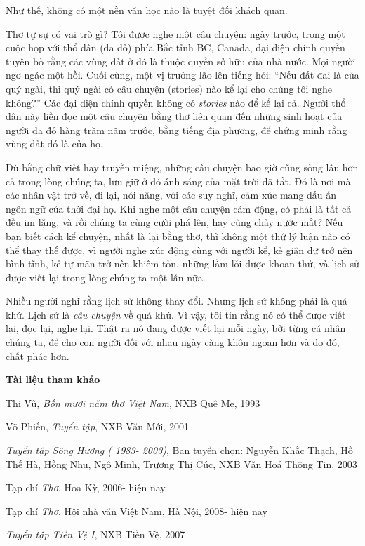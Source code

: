 \documentclass[../main.tex]{subfiles}
\begin{document}
\begin{multicols}{2}
Như thế, không có một nền văn học nào là tuyệt đối khách quan. 
 
Thơ tự sự có vai trò gì? Tôi được nghe một câu chuyện: ngày trước, trong một cuộc họp với thổ dân (da đỏ) phía Bắc tỉnh BC, Canada, đại diện chính quyền tuyên bố rằng các vùng đất ở đó là thuộc quyền sở hữu của nhà nước. Mọi người ngơ ngác một hồi. Cuối cùng, một vị trưởng lão lên tiếng hỏi: “Nếu đất đai là của quý ngài, thì quý ngài có câu chuyện (stories) nào kể lại cho chúng tôi nghe không?” Các đại diện chính quyền không có \textit{stories} nào để kể lại cả. Người thổ dân này liền đọc một câu chuyện bằng thơ liên quan đến những sinh hoạt của người da đỏ hàng trăm năm trước, bằng tiếng địa phương, để chứng minh rằng vùng đất đó là của họ.  
 
Dù bằng chữ viết hay truyền miệng, những câu chuyện bao giờ cũng sống lâu hơn cả trong lòng chúng ta, lưu giữ ở đó ánh sáng của mặt trời đã tắt. Đó là nơi mà các nhân vật trở về, đi lại, nói năng, với các suy nghĩ, cảm xúc mang dấu ấn ngôn ngữ của thời đại họ. Khi nghe một câu chuyện cảm động, có phải là tất cả đều im lặng, và rồi chúng ta cùng cười phá lên, hay cùng chảy nước mắt? Nếu bạn biết cách kể chuyện, nhất là lại bằng thơ, thì không một thứ lý luận nào có thể thay thế được, vì người nghe xúc động cùng với người kể, kẻ giận dữ trở nên bình tĩnh, kẻ tự mãn trở nên khiêm tốn, những lầm lỗi được khoan thứ, và lịch sử được viết lại trong lòng chúng ta một lần nữa.  
 
Nhiều người nghĩ rằng lịch sử không thay đổi. Nhưng lịch sử không phải là quá khứ. Lịch sử là \textit{câu chuyện} về quá khứ. Vì vậy, tôi tin rằng nó có thể được viết lại, đọc lại, nghe lại. Thật ra nó đang được viết lại mỗi ngày, bởi từng cá nhân chúng ta, để cho con người đối với nhau ngày càng khôn ngoan hơn và do đó, chất phác hơn. 
 
 
\textbf{Tài liệu tham khảo} 
 
Thi Vũ, \textit{Bốn mươi năm thơ Việt Nam}, NXB Quê Mẹ, 1993 
 
Võ Phiến, \textit{Tuyển tập}, NXB Văn Mới, 2001  
 
\textit{Tuyển tập Sông Hương ( 1983- 2003)}, Ban tuyển chọn: Nguyễn Khắc Thạch, Hồ Thế Hà, Hồng Nhu, Ngô Minh, Trương Thị Cúc, NXB Văn Hoá Thông Tin, 2003 
 
Tạp chí\textit{ Thơ}, Hoa Kỳ, 2006- hiện nay 
 
Tạp chí \textit{Thơ}, Hội nhà văn Việt Nam, Hà Nội, 2008- hiện nay 
 
\textit{Tuyển tập Tiền Vệ I}, NXB Tiền Vệ, 2007  
 

\end{multicols}
\end{document}
